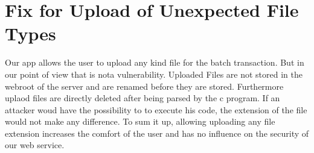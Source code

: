 \chapter{Fix for Upload of Unexpected File Types}
Our app allows the user to upload any kind file for the batch transaction. But in our point of view that is nota vulnerability. Uploaded Files are not stored in the webroot of the server and are renamed before they are stored. Furthermore uplaod files are directly deleted after being parsed by the c program.
If an attacker woud have the possibility to to execute his code, the extension of the file would not make any difference.
To sum it up, allowing uploading any file extension increases the comfort of the user and has no influence on the security of our web service.